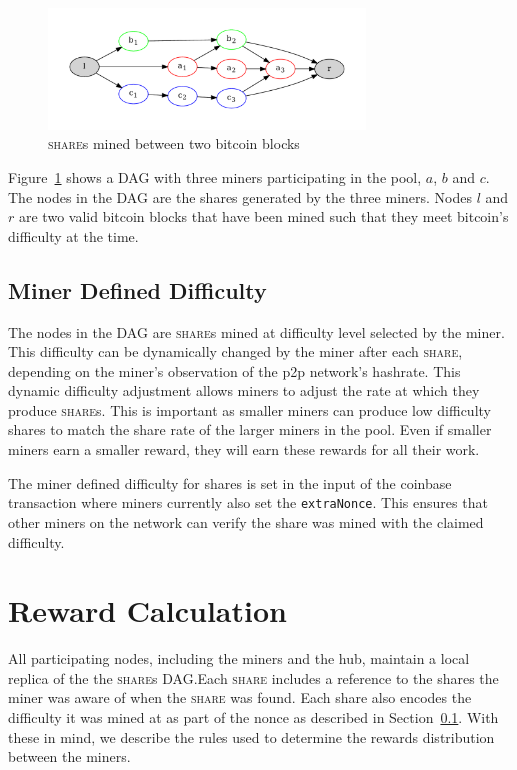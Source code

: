 \documentclass{article}
\begin{document}
\begin{figure}
  \begin{center}
    \includegraphics[width=0.75\textwidth]{dag}
    \caption{\textsc{share}s mined between two bitcoin blocks}\label{fig:dag}
  \end{center}
\end{figure}

Figure~\ref{fig:dag} shows a DAG with three miners participating
in the pool, $a$, $b$ and $c$. The nodes in the DAG are the shares
generated by the three miners. Nodes $l$ and $r$ are two valid bitcoin
blocks that have been mined such that they meet bitcoin's difficulty
at the time.

\subsection{Miner Defined Difficulty}\label{sec:share-difficulty}

The nodes in the DAG are \textsc{share}s mined at difficulty level
selected by the miner. This difficulty can be dynamically changed by
the miner after each \textsc{share}, depending on the miner's
observation of the p2p network's hashrate. This dynamic difficulty
adjustment allows miners to adjust the rate at which they produce
\textsc{share}s. This is important as smaller miners can produce low
difficulty shares to match the share rate of the larger miners in the
pool. Even if smaller miners earn a smaller reward, they will earn
these rewards for all their work.

The miner defined difficulty for shares is set in the input of the
coinbase transaction where miners currently also set the
\verb|extraNonce|. This ensures that other miners on the network can
verify the share was mined with the claimed difficulty.

\section{Reward Calculation}\label{sec:rewards}

All participating nodes, including the miners and the hub, maintain a
local replica of the the \textsc{share}s DAG.\@ Each \textsc{share}
includes a reference to the shares the miner was aware of when the
\textsc{share} was found. Each share also encodes the difficulty it
was mined at as part of the nonce as described in
Section~\ref{sec:share-difficulty}. With these in mind, we describe
the rules used to determine the rewards distribution between the
miners.
\end{document}
